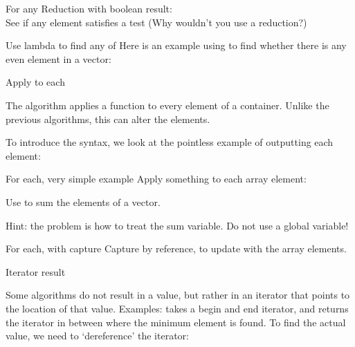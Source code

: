 \begin{block}{For any}
  \label{sl:alg-any}
  Reduction with boolean result:\\
  See if any element satisfies a test
  (Why wouldn't you use a  reduction?)
\end{block}

\begin{block}{Use lambda to find any of}
  \label{sl:lambda-any}
  Here is an example using  to find
  whether there is any even element in a vector:
\end{block}

 {Apply to each}

The  algorithm applies a function to every element
of a container.
Unlike the previous algorithms, this can alter the elements.

To introduce the syntax, we look at the pointless example of
outputting each element:

%

\begin{block}{For each, very simple example}
  \label{sl:alg-each}
  Apply something to each array element:
\end{block}

\begin{exercise}
  \label{ex:for-each-sum}
  Use  to sum the elements of a vector.

  Hint: the problem is how to treat the sum variable.
  Do not use a global variable!
\end{exercise}

\begin{block}{For each, with capture}
  \label{sl:alg-summing}
  Capture by reference, to update with the array elements.
\end{block}

 {Iterator result}

Some algorithms do not result in a value, but rather
in an iterator that points to the location of that value.
Examples:  takes a begin and end iterator,
and returns the iterator in between where the minimum element
is found.
To find the actual value, we need to `dereference'
the iterator:
%

